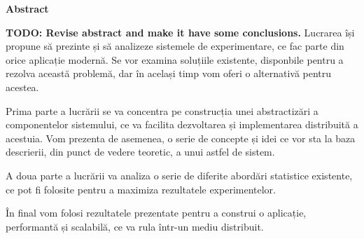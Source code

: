 \thispagestyle{plain}

\vspace*{\fill}

\begin{center}
	\Large \textbf{Abstract}	
\end{center}

\textbf{TODO: Revise abstract and make it have some conclusions.}
Lucrarea își propune să prezinte și să analizeze sistemele de experimentare, ce fac parte din orice aplicație modernă. Se vor examina soluțiile existente, disponbile pentru a rezolva această problemă, dar în același timp vom oferi o alternativă pentru acestea.

Prima parte a lucrării se va concentra pe construcția unei abstractizări a componentelor sistemului, ce va facilita dezvoltarea și implementarea distribuită a acestuia. Vom prezenta  de asemenea, o serie de concepte și idei ce vor sta la baza descrierii, din punct de vedere teoretic, a unui astfel de sistem.

A doua parte a lucrării va analiza o serie de diferite abordări statistice existente, ce pot fi folosite pentru a maximiza rezultatele experimentelor. 

În final vom folosi rezultatele prezentate pentru a construi o aplicație, performantă și scalabilă, ce va rula într-un mediu distribuit.

\vspace*{\fill}
